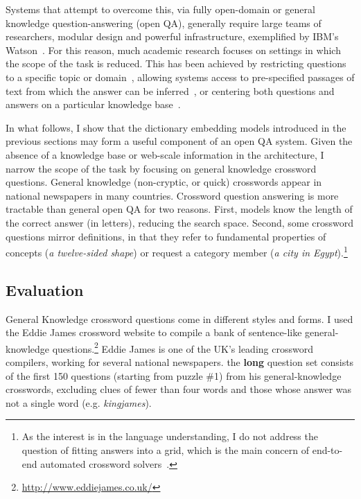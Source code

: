 Systems that attempt to overcome this, via fully open-domain or general knowledge question-answering (open QA), generally require large teams of researchers, modular design and powerful infrastructure, exemplified by IBM's Watson~\citep{ferrucci2010building}. For this reason, much academic research focuses on settings in which the scope of the task is reduced. This has been achieved by restricting questions to a specific topic or domain~\citep{molla2007question}, allowing systems access to pre-specified passages of text from which the answer can be inferred~\citep{Iyyer:Boyd-Graber:Claudino:Socher:Daume-2014,weston2015towards}, or centering both questions and answers on a particular knowledge base~\citep{berant14paraphrasing,bordes2014question}. 

In what follows, I show that the dictionary embedding models introduced in the previous sections may form a useful component of an open QA system. Given the absence of a knowledge base or web-scale information in the architecture, I narrow the scope of the task by focusing on general knowledge crossword questions. General knowledge (non-cryptic, or quick) crosswords appear in national newspapers in many countries. Crossword question answering is more tractable than general open QA for two reasons. First, models know the length of the correct answer (in letters), reducing the search space. Second, some crossword questions mirror definitions, in that they refer to fundamental properties of concepts (\emph{a twelve-sided shape}) or request a category member (\emph{a city in Egypt}).\footnote{As the interest is in the language understanding, I do not address the question of fitting answers into a grid, which is the main concern of end-to-end automated crossword solvers~\citep{littman2002probabilistic}.} 

\subsection{Evaluation} 

General Knowledge crossword questions come in different styles and forms. I used the Eddie James crossword website to compile a bank of sentence-like general-knowledge questions.\footnote{\url{http://www.eddiejames.co.uk/}} Eddie James is one of the UK's leading crossword compilers, working for several national newspapers. the { \bf long} question set consists of the first 150 questions (starting from puzzle \#1) from his general-knowledge crosswords, excluding clues of fewer than four words and those whose answer was not a single word (e.g. \emph{kingjames}).

